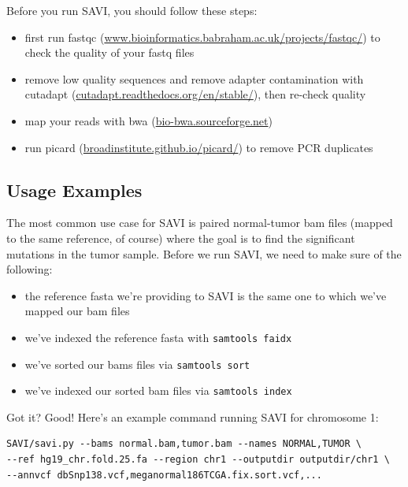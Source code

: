 \documentclass[letterpaper,14pt]{memoir}
\begin{document}
Before you run SAVI, you should follow these steps:

\begin{itemize}
\tightlist
\item
  first run
  fastqc (\href{http://www.bioinformatics.babraham.ac.uk/projects/fastqc/}{www.bioinformatics.babraham.ac.uk/projects/fastqc/})
  to check the quality of your fastq files
\item
  remove low quality sequences and remove adapter contamination with cutadapt
  (\href{http://cutadapt.readthedocs.org/en/stable/}{cutadapt.readthedocs.org/en/stable/}), then
  re-check quality
\item
  map your reads with bwa (\href{http://bio-bwa.sourceforge.net}{bio-bwa.sourceforge.net})
\item
  run picard (\href{http://broadinstitute.github.io/picard/}{broadinstitute.github.io/picard/}) to remove
  PCR duplicates
\end{itemize}

\subsection{Usage Examples}\label{Usage Examples}

The most common use case for SAVI is paired normal-tumor bam files
(mapped to the same reference, of course) where the goal is to find the
significant mutations in the tumor sample. Before we run SAVI, we need
to make sure of the following:

\begin{itemize}
\tightlist
\item
  the reference fasta we're providing to SAVI is the same one to which
  we've mapped our bam files
\item
  we've indexed the reference fasta with \texttt{samtools\ faidx}
\item
  we've sorted our bams files via \texttt{samtools\ sort}
\item
  we've indexed our sorted bam files via \texttt{samtools\ index}
\end{itemize}

\noindent Got it? Good! Here's an example command running SAVI for chromosome 1:

\begin{Verbatim}
SAVI/savi.py --bams normal.bam,tumor.bam --names NORMAL,TUMOR \
--ref hg19_chr.fold.25.fa --region chr1 --outputdir outputdir/chr1 \
--annvcf dbSnp138.vcf,meganormal186TCGA.fix.sort.vcf,...
\end{Verbatim}
\end{document}
